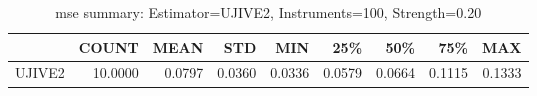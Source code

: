 \begin{table}[ht]
\centering
\caption{mse summary: Estimator=UJIVE2, Instruments=100, Strength=0.20}
\begin{tabular}{lrrrrrrrr}
\toprule
 & COUNT & MEAN & STD & MIN & 25\% & 50\% & 75\% & MAX \\
\midrule
UJIVE2 & 10.0000 & 0.0797 & 0.0360 & 0.0336 & 0.0579 & 0.0664 & 0.1115 & 0.1333 \\
\bottomrule
\end{tabular}
\end{table}
